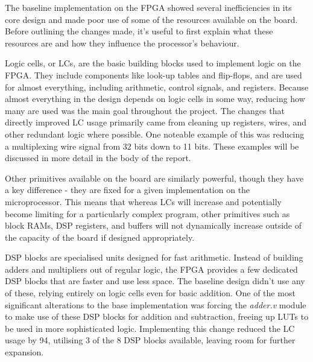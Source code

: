 \documentclass[a4paper,10pt]{article}
\begin{document}
The baseline implementation on the FPGA showed several inefficiencies 
in its core design and made poor use of 
some of the resources available on the board. 
Before outlining the changes made, it's useful to first explain 
what these resources are and how they influence the processor's behaviour.

Logic cells, or LCs, are the basic building blocks used to 
implement logic on the FPGA. 
They include components like look-up tables and flip-flops, 
and are used for almost everything, including 
arithmetic, control signals, and registers. 
Because almost everything in the design depends on logic cells in some way, 
reducing how many are used was the main goal throughout the project.
The changes that directly improved LC usage primarily came from
cleaning up registers, wires, and other redundant logic where possible.
One noteable example of this was reducing a multiplexing wire signal
from 32 bits down to 11 bits. These examples will be discussed in more detail
in the body of the report.

Other primitives available on the board are similarly powerful,
though they have a key difference - they are fixed for a given implementation
on the microprocessor.
This means that whereas LCs will increase and potentially become limiting
for a particularly complex program, 
other primitives such as block RAMs, DSP registers, and buffers
will not dynamically increase outside of 
the capacity of the board if designed appropriately.

DSP blocks are specialised units designed for fast arithmetic. 
Instead of building adders and multipliers out of regular logic, 
the FPGA provides a few dedicated DSP blocks that are faster and use less space. 
The baseline design didn't use any of these, 
relying entirely on logic cells even for basic addition. 
One of the most significant alterations to the base implementation
was forcing the \textit{adder.v} module to make use of these DSP blocks
for addition and subtraction, 
freeing up LUTs to be used in more sophisticated logic.
Implementing this change reduced the LC usage by 94, 
utilising 3 of the 8 DSP blocks available,
leaving room for further expansion.
\end{document}
